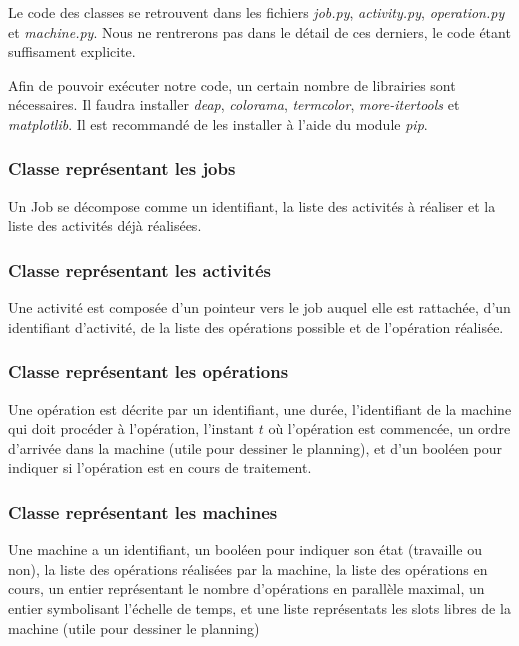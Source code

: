 Le code des classes se retrouvent dans les fichiers \textit{job.py}, \textit{activity.py}, \textit{operation.py} et \textit{machine.py}. Nous ne rentrerons pas dans le détail de ces derniers, le code étant suffisament explicite.

Afin de pouvoir exécuter notre code, un certain nombre de librairies sont nécessaires. Il faudra installer \textit{deap}, \textit{colorama}, \textit{termcolor}, \textit{more-itertools} et \textit{matplotlib}. Il est recommandé de les installer à l'aide du module \textit{pip}.

\subsubsection{Classe représentant les jobs}

Un Job se décompose comme un identifiant, la liste des activités à réaliser et la liste des activités déjà réalisées.

\subsubsection{Classe représentant les activités}

Une activité est composée d'un pointeur vers le job auquel elle est rattachée, d'un identifiant d'activité, de la liste des opérations possible et de l'opération réalisée.

\subsubsection{Classe représentant les opérations}

Une opération est décrite par un identifiant, une durée, l'identifiant de la machine qui doit procéder à l'opération, l'instant $t$ où l'opération est commencée, un ordre d'arrivée dans la machine (utile pour dessiner le planning), et d'un booléen pour indiquer si l'opération est en cours de traitement.

\subsubsection{Classe représentant les machines}

Une machine a un identifiant, un booléen pour indiquer son état (travaille ou non), la liste des opérations réalisées par la machine, la liste des opérations en cours, un entier représentant le nombre d'opérations en parallèle maximal, un entier symbolisant l'échelle de temps, et une liste représentats les slots libres de la machine (utile pour dessiner le planning) 